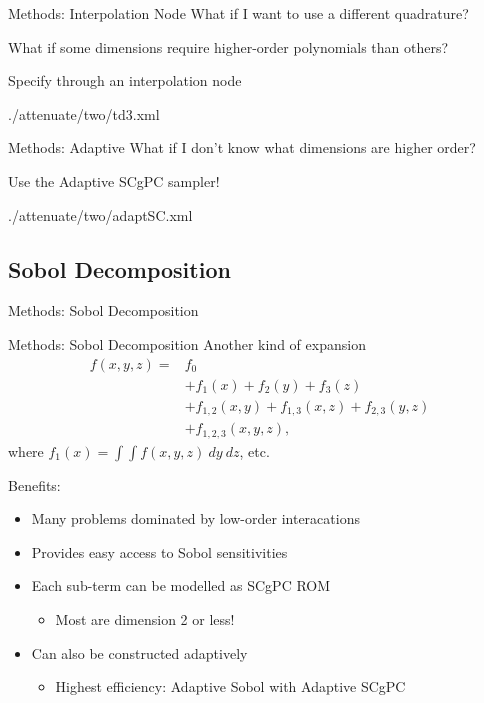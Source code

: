 \documentclass[t,9pt,svgnames]{beamer}
\begin{document}
\begin{frame}{Methods: Interpolation Node}
  What if I want to use a different quadrature?

  What if some dimensions require higher-order polynomials than others?

  Specify through an interpolation node
  
          {./attenuate/two/td3.xml}
  
\end{frame}

\begin{frame}{Methods: Adaptive}
  What if I don't know what dimensions are higher order?

  Use the Adaptive SCgPC sampler!
  
          {./attenuate/two/adaptSC.xml}
\end{frame}

\subsection{Sobol Decomposition}
\begin{frame}{Methods: Sobol Decomposition}
\end{frame}

\begin{frame}{Methods: Sobol Decomposition}
  Another kind of expansion
  \begin{align*}
    f(x,y,z) =& f_0 \\
             &+ f_1(x) + f_2(y) + f_3(z)\\
             &+ f_{1,2}(x,y) + f_{1,3}(x,z) + f_{2,3}(y,z) \\
             &+ f_{1,2,3}(x,y,z),
  \end{align*}
  where $f_1(x)=\int\int f(x,y,z)\ dy\ dz$, etc.

  Benefits:
  \begin{itemize}
    \item Many problems dominated by low-order interacations
    \item Provides easy access to Sobol sensitivities
    \item Each sub-term can be modelled as SCgPC ROM
    \begin{itemize}
      \item Most are dimension 2 or less!
    \end{itemize}
    \item Can also be constructed adaptively
    \begin{itemize}
      \item Highest efficiency: Adaptive Sobol with Adaptive SCgPC
    \end{itemize}
  \end{itemize}
\end{frame}
\end{document}
